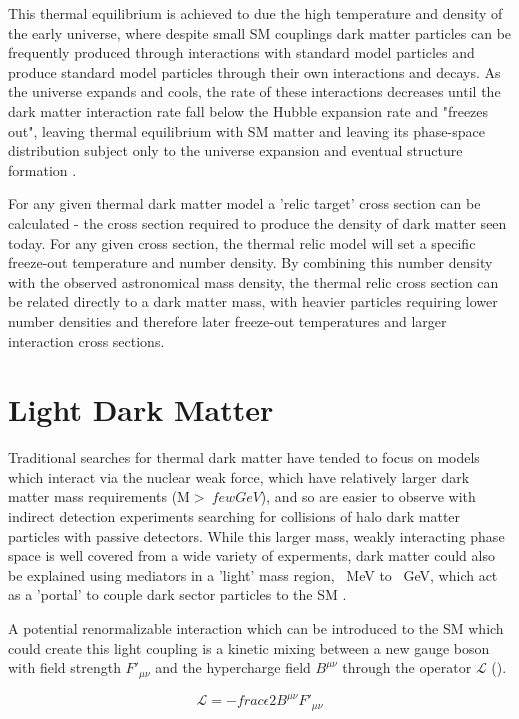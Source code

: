 This thermal equilibrium is achieved to due the high temperature and density of the early universe, where despite small SM couplings dark matter particles can be frequently produced through interactions with standard model particles and produce standard model particles through their own interactions and decays.
As the universe expands and cools, the rate of these interactions decreases until the dark matter interaction rate fall below the Hubble expansion rate and "freezes out", leaving thermal equilibrium with SM matter and leaving its phase-space distribution subject only to the universe expansion and eventual structure formation \cite{ref:thermalDM}.

For any given thermal dark matter model a 'relic target' cross section can be calculated - the cross section required to produce the density of dark matter seen today.
For any given cross section, the thermal relic model will set a specific freeze-out temperature and number density.
By combining this number density with the observed astronomical mass density, the thermal relic cross section can be related directly to a dark matter mass, with heavier particles requiring lower number densities and therefore later freeze-out temperatures and larger interaction cross sections.

\section{Light Dark Matter}
Traditional searches for thermal dark matter have tended to focus on models which interact via the nuclear weak force, which have relatively larger dark matter mass requirements (M$>~few GeV$), and so are easier to observe with indirect detection experiments searching for collisions of halo dark matter particles with passive detectors.
While this larger mass, weakly interacting phase space is well covered from a wide variety of experments, dark matter could also be explained using mediators in a 'light' mass region, ~MeV to ~GeV, which act as a 'portal' to couple dark sector particles to the SM \cite{darkSectors}.


A potential renormalizable interaction which can be introduced to the SM which could create this light coupling is a kinetic mixing between a new gauge boson with field strength $F'_{\mu\nu}$ and the hypercharge field $B^{\mu\nu}$ through the operator $\mathcal{L}$ (). 

\begin{equation}
	\label{eq:LDMlagrangian}
	\mathcal{L} = - frac{\epsilon}{2} B^{\mu\nu}F'_{\mu\nu}
\end{equation}

